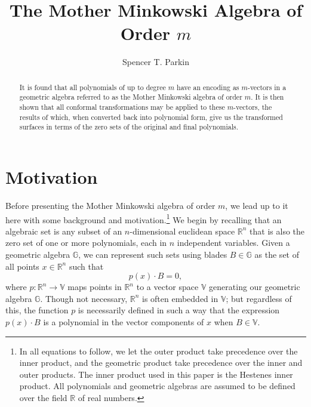 \documentclass{ecgd-l}
\numberwithin{equation}{section}
\newcommand{\R}{\mathbb{R}}
\newcommand{\G}{\mathbb{G}}
\newcommand{\V}{\mathbb{V}}
\begin{document}
\title{The Mother Minkowski Algebra of Order $m$}

\author{Spencer T. Parkin}
\address{102 W. 500 S., Salt Lake City, UT  84101}




\begin{abstract}
It is found that all polynomials of up to degree $m$
have an encoding as $m$-vectors in a geometric algebra referred
to as the Mother Minkowski algebra of order $m$.
It is then shown that all conformal transformations may be
applied to these $m$-vectors, the results of which, when converted
back into polynomial form, give us the transformed surfaces in terms
of the zero sets of the original and final polynomials.
\end{abstract}

\maketitle

\section{Motivation}

Before presenting the Mother Minkowski algebra of order $m$, we lead up to it here with
some background and motivation.\footnote{In all equations to follow, we let the
outer product take precedence over the inner product, and the geometric product
take precedence over the inner and outer products.  The inner product used in this
paper is the Hestenes inner product.  All polynomials and geometric algebras are assumed
to be defined over the field $\R$ of real numbers.}
We begin by recalling that an algebraic set is any 
subset of an $n$-dimensional euclidean space $\R^n$ that is also the zero set of one
or more polynomials, each in $n$ independent variables.  Given a geometric algebra $\G$, we can represent such sets
using blades $B\in\G$ as the set of all points $x\in\R^n$ such that
\begin{equation*}
p(x)\cdot B=0,
\end{equation*}
where $p:\R^n\to\V$ maps points in $\R^n$ to a vector space $\V$ generating
our geometric algebra $\G$.  Though not necessary, $\R^n$ is often embedded in $\V$;
but regardless of this, the function $p$ is necessarily defined in such a way that the expression
$p(x)\cdot B$ is a polynomial in the vector components of $x$ when $B\in\V$.
\end{document}
